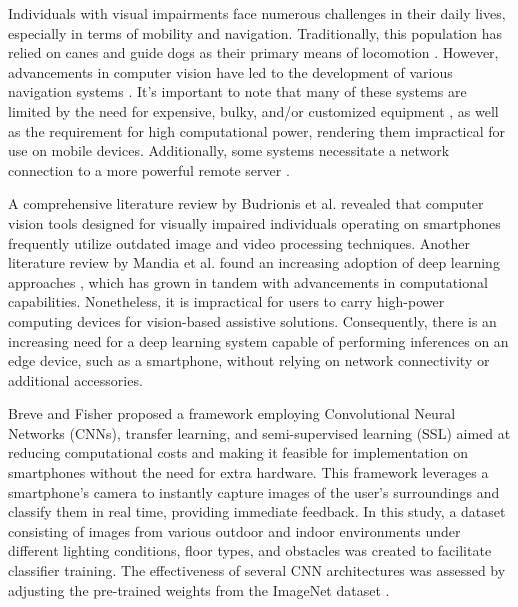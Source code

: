 \documentclass[preprint,12pt]{elsarticle}
\begin{document}
Individuals with visual impairments face numerous challenges in their daily lives, especially in terms of mobility and navigation. Traditionally, this population has relied on canes and guide dogs as their primary means of locomotion \cite{islam2019}. However, advancements in computer vision have led to the development of various navigation systems \cite{islam2019,mandia2023,budrionis2022,kuriakose2021,cardillo2019,bai2019,jiang2019,joe2019,hoang2017,tapu2017,saffoury2016,poggi2016,lakde2015}. It's important to note that many of these systems are limited by the need for expensive, bulky, and/or customized equipment \cite{hoang2017,tapu2017,saffoury2016,poggi2016,poggi2015,rizzo2017}, as well as the requirement for high computational power, rendering them impractical for use on mobile devices. Additionally, some systems necessitate a network connection to a more powerful remote server \cite{jiang2019,lin2017}.

A comprehensive literature review by Budrionis et al. \cite{budrionis2022} revealed that computer vision tools designed for visually impaired individuals operating on smartphones frequently utilize outdated image and video processing techniques. Another literature review by Mandia et al. \cite{mandia2023} found an increasing adoption of deep learning approaches \cite{lecun2015,goodfellow2016,schmidhuber2015}, which has grown in tandem with advancements in computational capabilities. Nonetheless, it is impractical for users to carry high-power computing devices for vision-based assistive solutions. Consequently, there is an increasing need for a deep learning system capable of performing inferences on an edge device, such as a smartphone, without relying on network connectivity or additional accessories.

Breve and Fisher \cite{breve2020} proposed a framework employing Convolutional Neural Networks (CNNs), transfer learning, and semi-supervised learning (SSL) aimed at reducing computational costs and making it feasible for implementation on smartphones without the need for extra hardware. This framework leverages a smartphone's camera to instantly capture images of the user's surroundings and classify them in real time, providing immediate feedback. In this study, a dataset consisting of images from various outdoor and indoor environments under different lighting conditions, floor types, and obstacles was created to facilitate classifier training. The effectiveness of several CNN architectures was assessed by adjusting the pre-trained weights from the ImageNet dataset \cite{russakovsky2015}.
\end{document}
